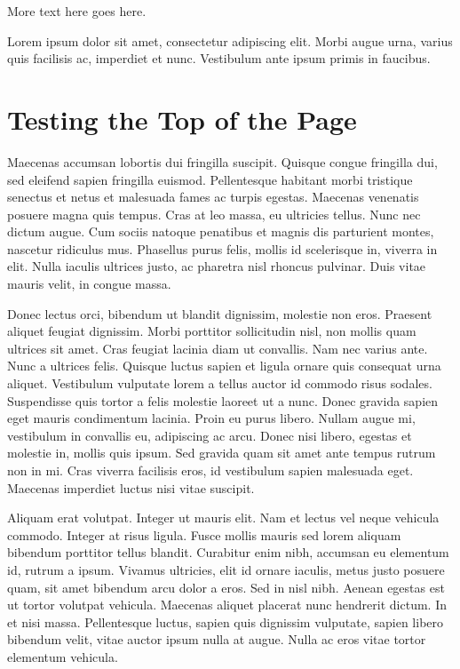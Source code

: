 More text here goes here.


Lorem ipsum dolor sit amet, consectetur adipiscing elit. Morbi augue urna, varius quis facilisis ac, imperdiet et nunc. Vestibulum ante ipsum primis in faucibus. 

\section{Testing the Top of the Page}
Maecenas accumsan lobortis dui fringilla suscipit. Quisque congue fringilla dui, sed eleifend sapien fringilla euismod. Pellentesque habitant morbi tristique senectus et netus et malesuada fames ac turpis egestas. Maecenas venenatis posuere magna quis tempus. Cras at leo massa, eu ultricies tellus. Nunc nec dictum augue. Cum sociis natoque penatibus et magnis dis parturient montes, nascetur ridiculus mus. Phasellus purus felis, mollis id scelerisque in, viverra in elit. Nulla iaculis ultrices justo, ac pharetra nisl rhoncus pulvinar. Duis vitae mauris velit, in congue massa.

Donec lectus orci, bibendum ut blandit dignissim, molestie non eros. Praesent aliquet feugiat dignissim. Morbi porttitor sollicitudin nisl, non mollis quam ultrices sit amet. Cras feugiat lacinia diam ut convallis. Nam nec varius ante. Nunc a ultrices felis. Quisque luctus sapien et ligula ornare quis consequat urna aliquet. Vestibulum vulputate lorem a tellus auctor id commodo risus sodales. Suspendisse quis tortor a felis molestie laoreet ut a nunc. Donec gravida sapien eget mauris condimentum lacinia. Proin eu purus libero. Nullam augue mi, vestibulum in convallis eu, adipiscing ac arcu. Donec nisi libero, egestas et molestie in, mollis quis ipsum. Sed gravida quam sit amet ante tempus rutrum non in mi. Cras viverra facilisis eros, id vestibulum sapien malesuada eget. Maecenas imperdiet luctus nisi vitae suscipit.



Aliquam erat volutpat. Integer ut mauris elit. Nam et lectus vel neque vehicula commodo. Integer at risus ligula. Fusce mollis mauris sed lorem aliquam bibendum porttitor tellus blandit. Curabitur enim nibh, accumsan eu elementum id, rutrum a ipsum. Vivamus ultricies, elit id ornare iaculis, metus justo posuere quam, sit amet bibendum arcu dolor a eros. Sed in nisl nibh. Aenean egestas est ut tortor volutpat vehicula. Maecenas aliquet placerat nunc hendrerit dictum. In et nisi massa. Pellentesque luctus, sapien quis dignissim vulputate, sapien libero bibendum velit, vitae auctor ipsum nulla at augue. Nulla ac eros vitae tortor elementum vehicula.

